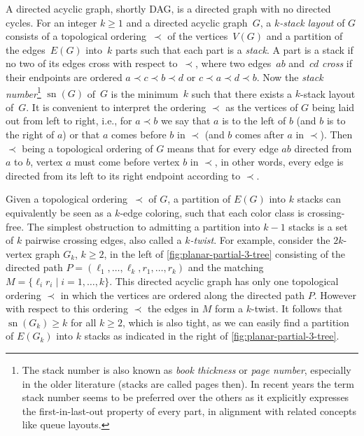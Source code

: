 \documentclass{article}
\DeclareMathOperator{\sn}{sn}
\begin{document}
A directed acyclic graph, shortly DAG, is a directed graph with no directed cycles.
For an integer $k \geq 1$ and a directed acyclic graph~$G$, a \emph{$k$-stack layout} of $G$ consists of a topological ordering~$\prec$ of the vertices~$V(G)$ and a partition of the edges~$E(G)$ into~$k$ parts such that each part is a \emph{stack}.
A part is a stack if no two of its edges cross with respect to~$\prec$, where two edges~$ab$ and~$cd$ \emph{cross} if their endpoints are ordered $a \prec c \prec b \prec d$ or $c \prec a \prec d \prec b$.
Now the \emph{stack number}\footnote{
    The stack number is also known as \emph{book thickness} or \emph{page number}, especially in the older literature (stacks are called pages then).
    In recent years the term stack number seems to be preferred over the others as it explicitly expresses the first-in-last-out property of every part, in alignment with related concepts like queue layouts.
} $\sn(G)$ of~$G$ is the minimum~$k$ such that there exists a $k$-stack layout of~$G$.
It is convenient to interpret the ordering $\prec$ as the vertices of $G$ being laid out from left to right, i.e., for $a \prec b$ we say that $a$ is to the left of $b$ (and $b$ is to the right of $a$) or that $a$ comes before $b$ in $\prec$ (and $b$ comes after $a$ in $\prec$).
Then $\prec$ being a topological ordering of $G$ means that for every edge $ab$ directed from $a$ to $b$, vertex $a$ must come before vertex $b$ in $\prec$, in other words, every edge is directed from its left to its right endpoint according to $\prec$.

Given a topological ordering~$\prec$ of $G$, a partition of $E(G)$ into $k$ stacks can equivalently be seen as a $k$-edge coloring, such that each color class is crossing-free.
The simplest obstruction to admitting a partition into $k-1$ stacks is a set of $k$ pairwise crossing edges, also called a \emph{$k$-twist}.
For example, consider the $2k$-vertex graph $G_k$, $k \geq 2$, in the left of \cref{fig:planar-partial-3-tree} consisting of the directed path $P = (\ell_1,\ldots,\ell_k,r_1,\ldots,r_k)$ and the matching $M = \{\ell_i r_i \mid i=1,\ldots,k\}$.
This directed acyclic graph has only one topological ordering $\prec$ in which the vertices are ordered along the directed path $P$.
However with respect to this ordering $\prec$ the edges in $M$ form a $k$-twist.
It follows that $\sn(G_k) \geq k$ for all $k \geq 2$, which is also tight, as we can easily find a partition of $E(G_k)$ into $k$ stacks as indicated in the right of \cref{fig:planar-partial-3-tree}.
\end{document}
